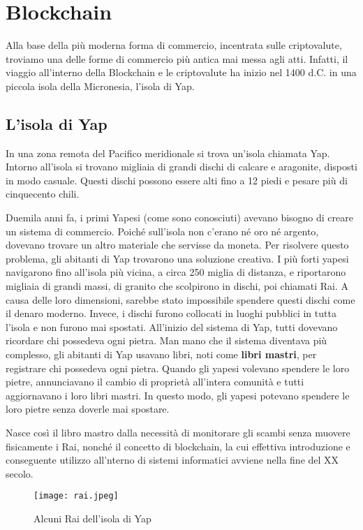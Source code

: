 \chapter{Blockchain}
Alla base della più moderna forma di commercio, incentrata sulle criptovalute, troviamo una delle forme di commercio più antica mai messa agli atti. Infatti, il viaggio all'interno della Blockchain e le criptovalute ha inizio nel 1400 d.C. in una piccola isola della Micronesia, l'isola di Yap.

\section{L'isola di Yap}
In una zona remota del Pacifico meridionale si trova un'isola chiamata Yap. Intorno all'isola si trovano migliaia di grandi dischi di calcare e aragonite, disposti in modo casuale. Questi dischi possono essere alti fino a 12 piedi e pesare più di cinquecento chili.

Duemila anni fa, i primi Yapesi (come sono conosciuti) avevano bisogno di creare un sistema di commercio. Poiché sull'isola non c'erano né oro né argento, dovevano trovare un altro materiale che servisse da moneta. Per risolvere questo problema, gli abitanti di Yap trovarono una soluzione creativa. I più forti yapesi navigarono fino all'isola più vicina, a circa 250 miglia di distanza, e riportarono migliaia di grandi massi, di granito che scolpirono in dischi, poi chiamati Rai. A causa delle loro dimensioni, sarebbe stato impossibile spendere questi dischi come il denaro moderno. Invece, i dischi furono collocati in luoghi pubblici in tutta l'isola e non furono mai spostati. All'inizio del sistema di Yap, tutti dovevano ricordare chi possedeva ogni pietra. Man mano che il sistema diventava più complesso, gli abitanti di Yap usavano libri, noti come \textbf{libri mastri}, per registrare chi possedeva ogni pietra. Quando gli yapesi volevano spendere le loro pietre, annunciavano il cambio di proprietà all'intera comunità e tutti aggiornavano i loro libri mastri. In questo modo, gli yapesi potevano spendere le loro pietre senza doverle mai spostare.

Nasce così il libro mastro dalla necessità di monitorare gli scambi senza muovere fisicamente i Rai, nonché il concetto di blockchain, la cui effettiva introduzione e conseguente utilizzo all'nterno di sistemi informatici avviene nella fine del XX secolo.

\begin{figure}[htbp]
  \centering
  \texttt{[image: rai.jpeg]}
  \caption{Alcuni Rai dell'isola di Yap}
  \label{fig:rai}
\end{figure}

